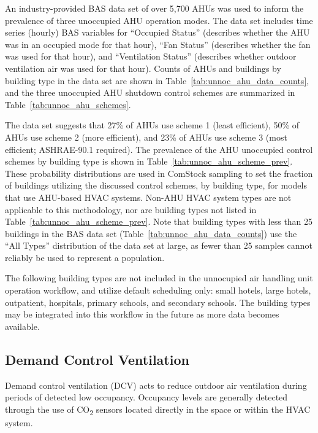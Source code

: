 An industry-provided BAS data set of over 5,700 AHUs was used to inform the prevalence of three unoccupied AHU operation modes. The data set includes time series (hourly) BAS variables for ``Occupied Status'' (describes whether the AHU was in an occupied mode for that hour), ``Fan Status'' (describes whether the fan was used for that hour), and ``Ventilation Status'' (describes whether outdoor ventilation air was used for that hour). Counts of AHUs and buildings by building type in the data set are shown in Table~\ref{tab:unnoc_ahu_data_counts}, and the three unoccupied AHU shutdown control schemes are summarized in Table~\ref{tab:unnoc_ahu_schemes}.

The data set suggests that 27\% of AHUs use scheme 1 (least efficient), 50\% of AHUs use scheme 2 (more efficient), and 23\% of AHUs use scheme 3 (most efficient; ASHRAE-90.1 required). The prevalence of the AHU unoccupied control schemes by building type is shown in Table~\ref{tab:unnoc_ahu_scheme_prev}. These probability distributions are used in ComStock sampling to set the fraction of buildings utilizing the discussed control schemes, by building type, for models that use AHU-based HVAC systems. Non-AHU HVAC system types are not applicable to this methodology, nor are building types not listed in Table~\ref{tab:unnoc_ahu_scheme_prev}. Note that building types with less than 25 buildings in the BAS data set (Table~\ref{tab:unnoc_ahu_data_counts}) use the ``All Types'' distribution of the data set at large, as fewer than 25 samples cannot reliably be used to represent a population.

The following building types are not included in the unnocupied air handling unit operation workflow, and utilize default scheduling only: small hotels, large hotels, outpatient, hospitals, primary schools, and secondary schools. The building types may be integrated into this workflow in the future as more data becomes available.




\subsection{Demand Control Ventilation}

Demand control ventilation (DCV) acts to reduce outdoor air ventilation during periods of detected low occupancy. Occupancy levels are generally detected through the use of CO\textsubscript{2} sensors located directly in the space or within the HVAC system.

